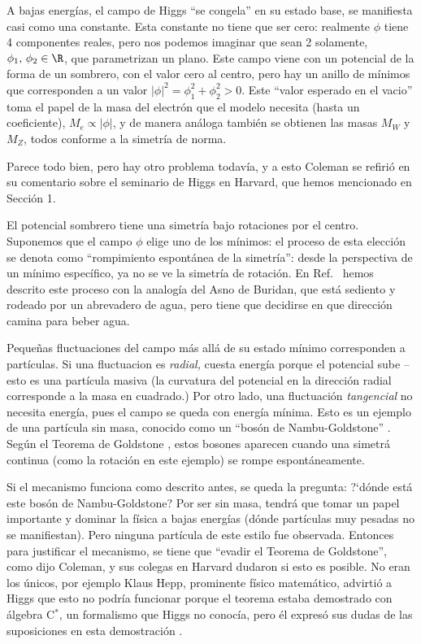 A bajas energ\'ias, el campo de Higgs ``se congela'' en su estado
base, se manifiesta casi como una constante. Esta constante no
tiene que ser cero: realmente $\phi$ tiene 4 componentes reales, pero
nos podemos imaginar que sean 2 solamente,
$\phi_1 , \, \phi_2 \in \R$, que parametrizan un
plano. Este campo viene con un potencial de la forma de
un sombrero, con el valor cero al centro, pero hay un anillo
de m\'inimos que corresponden a un valor
$|\phi|^2 = \phi_1^2 + \phi_2^2 > 0$.
Este ``valor esperado en el vacio'' toma el papel de la masa
del electr\'on que el modelo necesita (hasta un coeficiente),
$M_e \propto |\phi|$, y de manera an\'aloga tambi\'en se obtienen
las masas $M_W$ y $M_Z$, todos conforme a la simetr\'ia de norma.

Parece todo bien, pero hay otro problema todav\'ia, y a esto
Coleman se refiri\'o en su comentario sobre el seminario de
Higgs en Harvard, que hemos mencionado en Secci\'on 1.

El potencial sombrero tiene una simetr\'ia bajo rotaciones por
el centro. Suponemos que el campo $\phi$ elige uno de
los m\'inimos: el proceso de esta elecci\'on se denota como
``rompimiento espont\'anea de la simetr\'ia'': desde
la perspectiva de un m\'inimo espec\'ifico, ya no se ve la
simetr\'ia de rotaci\'on. En Ref.\ \cite{HiggsBol} hemos
descrito este proceso con la analog\'ia del Asno de Buridan,
que est\'a sediento y rodeado por un abrevadero de agua, pero
tiene que decidirse en que direcci\'on camina para beber agua.

Peque\~nas fluctuaciones del campo m\'as all\'a de su estado
m\'inimo corresponden a part\'iculas. Si una fluctuacion es
{\em radial,} cuesta energ\'ia porque el potencial sube -- esto
es una part\'icula masiva (la curvatura del potencial en la
direcci\'on radial corresponde a la masa en cuadrado.)
Por otro lado, una fluctuaci\'on {\em tangencial} no necesita
energ\'ia, pues el campo se queda con energ\'ia m\'inima.
Esto es un ejemplo de una part\'icula sin masa, conocido
como un ``bos\'on de Nambu-Goldstone'' \cite{Nambu,Goldstone}.
Seg\'un el Teorema de Goldstone \cite{GSW}, estos bosones aparecen
cuando una simetr\'a continua (como la rotaci\'on en este
ejemplo) se rompe espont\'aneamente.

Si el mecanismo funciona como descrito antes, se queda la
pregunta: ?`d\'onde est\'a este bos\'on de Nambu-Goldstone?
Por ser sin masa, tendr\'a que tomar un papel importante
y dominar la f\'isica a bajas energ\'ias (d\'onde part\'iculas
muy pesadas no se manifiestan). Pero ninguna part\'icula de
este estilo fue observada. Entonces para justificar el mecanismo,
se tiene que ``evadir el Teorema de Goldstone'', como dijo
Coleman, y sus colegas en Harvard dudaron si esto es posible.
No eran los \'unicos, por ejemplo Klaus Hepp, prominente
f\'isico matem\'atico, advirti\'o a Higgs que esto no podr\'ia
funcionar porque el teorema estaba demostrado con \'algebra
C$^{*}$, un formalismo que Higgs no conoc\'ia, pero \'el expres\'o
sus dudas de las suposiciones en esta demostraci\'on \cite{boson}.

